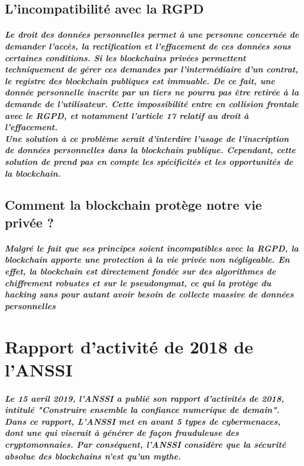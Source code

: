 \documentclass[12pt, a4paper, oneside]{book}
\begin{document}
    \section{L'incompatibilité avec la RGPD}
    \paragraph{Le droit des données personnelles permet 
    à une personne concernée de demander l’accès, la rectification 
    et l’effacement de ces données sous certaines conditions. 
    Si les blockchains privées permettent techniquement de gérer
    ces demandes par l’intermédiaire d’un contrat,
    le registre des blockchain publiques est immuable. De ce fait,
    une donnée personnelle inscrite par un tiers ne pourra pas être retirée 
    à la demande de l’utilisateur. Cette impossibilité entre en collision frontale avec le RGPD, 
    et notamment l’article 17 relatif au droit à l’effacement. 
    \\ 
    \newline
    Une solution à ce problème serait d'interdire l'usage de l'inscription de données personnelles dans la blockchain publique. 
    Cependant, cette solution de prend pas en compte les spécificités et les opportunités de la blockchain.
    }

    \section{Comment la blockchain protège notre vie privée ?}

    \paragraph{Malgré le fait que ses principes 
     soient incompatibles avec la RGPD, la blockchain apporte une protection à la vie privée non négligeable. 
     En effet, la blockchain est directement fondée sur des algorithmes de chiffrement robustes et sur le pseudonymat,
     ce qui la protège du hacking sans pour autant avoir besoin de collecte massive de données personnelles}

    \chapter{Rapport d'activité de 2018 de l'ANSSI}

    \paragraph{Le 15 avril 2019, l'ANSSI a publié son rapport d'activités de 2018, intitulé \it{"Construire ensemble la confiance numerique de demain"}. 
    Dans ce rapport, L'ANSSI met en avant 5 types de cybermenaces, dont une qui viserait à générer de façon frauduleuse des cryptomonnaies. Par conséquent, l'ANSSI considère que la sécurité absolue des blockchains n'est qu'un mythe.}
\end{document}
